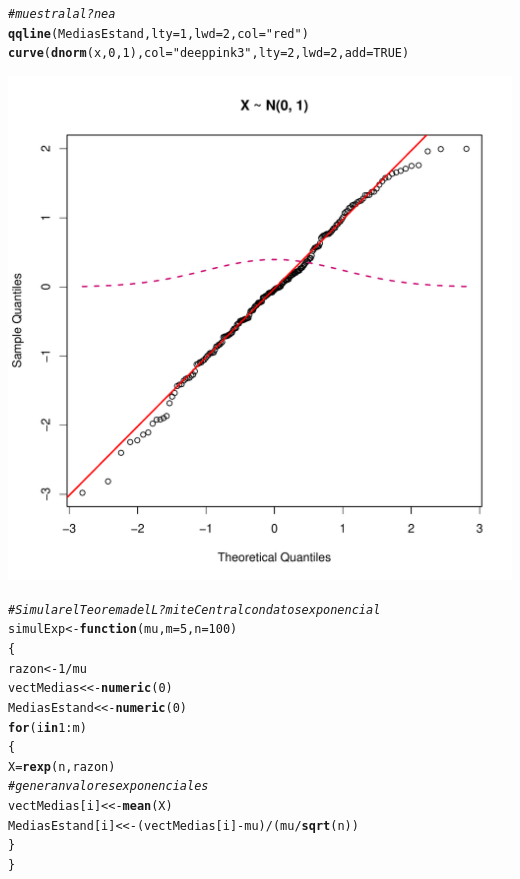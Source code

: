 \documentclass[10pt,a4paper]{article}\usepackage[]{graphicx}\usepackage[]{color}
\makeatletter
\def\maxwidth{ %
  \ifdim\Gin@nat@width>\linewidth
    \linewidth
  \else
    \Gin@nat@width
  \fi
}
\newcommand{\hlnum}[1]{\textcolor[rgb]{0.686,0.059,0.569}{#1}}%
\newcommand{\hlstr}[1]{\textcolor[rgb]{0.192,0.494,0.8}{#1}}%
\newcommand{\hlcom}[1]{\textcolor[rgb]{0.678,0.584,0.686}{\textit{#1}}}%
\newcommand{\hlopt}[1]{\textcolor[rgb]{0,0,0}{#1}}%
\newcommand{\hlstd}[1]{\textcolor[rgb]{0.345,0.345,0.345}{#1}}%
\newcommand{\hlkwa}[1]{\textcolor[rgb]{0.161,0.373,0.58}{\textbf{#1}}}%
\newcommand{\hlkwb}[1]{\textcolor[rgb]{0.69,0.353,0.396}{#1}}%
\newcommand{\hlkwc}[1]{\textcolor[rgb]{0.333,0.667,0.333}{#1}}%
\newcommand{\hlkwd}[1]{\textcolor[rgb]{0.737,0.353,0.396}{\textbf{#1}}}%
\newenvironment{kframe}{%
 \def\at@end@of@kframe{}%
 \ifinner\ifhmode%
  \def\at@end@of@kframe{\end{minipage}}%
  \begin{minipage}{\columnwidth}%
 \fi\fi%
 \def\FrameCommand##1{\hskip\@totalleftmargin \hskip-\fboxsep
 \colorbox{shadecolor}{##1}\hskip-\fboxsep
     \hskip-\linewidth \hskip-\@totalleftmargin \hskip\columnwidth}%
 \MakeFramed {\advance\hsize-\width
   \@totalleftmargin\z@ \linewidth\hsize
   \@setminipage}}%
 {\par\unskip\endMakeFramed%
 \at@end@of@kframe}
\newenvironment{knitrout}{}{} %
\makeatother
\begin{document}
\begin{knitrout}
\begin{kframe}
\begin{alltt}
\hlcom{#muestra la l?nea }
\hlkwd{qqline}\hlstd{(MediasEstand,} \hlkwc{lty}\hlstd{=}\hlnum{1}\hlstd{,} \hlkwc{lwd}\hlstd{=}\hlnum{2}\hlstd{,} \hlkwc{col}\hlstd{=}\hlstr{"red"}\hlstd{)}
\hlkwd{curve}\hlstd{(}\hlkwd{dnorm}\hlstd{(x,} \hlnum{0}\hlstd{,} \hlnum{1}\hlstd{),} \hlkwc{col} \hlstd{=} \hlstr{"deeppink3"}\hlstd{,} \hlkwc{lty}\hlstd{=}\hlnum{2}\hlstd{,} \hlkwc{lwd}\hlstd{=}\hlnum{2}\hlstd{,} \hlkwc{add}\hlstd{=}\hlnum{TRUE}\hlstd{)}
\end{alltt}
\end{kframe}
\includegraphics[width=\maxwidth]{figure/unnamed-chunk-2-2} 
\begin{kframe}\begin{alltt}
\hlcom{#Simular el Teorema del L?mite Central con datos exponencial}
\hlstd{simulExp} \hlkwb{<-} \hlkwa{function}\hlstd{(}\hlkwc{mu}\hlstd{,} \hlkwc{m}\hlstd{=}\hlnum{5}\hlstd{,} \hlkwc{n}\hlstd{=}\hlnum{100}\hlstd{)}
\hlstd{\{}
  \hlstd{razon} \hlkwb{<-} \hlnum{1}\hlopt{/}\hlstd{mu}
  \hlstd{vectMedias} \hlkwb{<<-} \hlkwd{numeric}\hlstd{(}\hlnum{0}\hlstd{)}
  \hlstd{MediasEstand} \hlkwb{<<-} \hlkwd{numeric}\hlstd{(}\hlnum{0}\hlstd{)}
  \hlkwa{for} \hlstd{(i} \hlkwa{in} \hlnum{1}\hlopt{:}\hlstd{m)}
  \hlstd{\{}
    \hlstd{X} \hlkwb{=} \hlkwd{rexp}\hlstd{(n, razon)}
    \hlcom{# genera n valores exponenciales }
    \hlstd{vectMedias[i]} \hlkwb{<<-} \hlkwd{mean}\hlstd{(X)}
    \hlstd{MediasEstand[i]} \hlkwb{<<-} \hlstd{(vectMedias[i]} \hlopt{-} \hlstd{mu)}\hlopt{/}\hlstd{(mu}\hlopt{/}\hlkwd{sqrt}\hlstd{(n))}
  \hlstd{\}}
\hlstd{\}}


\end{alltt}
\end{kframe}
\end{knitrout}
\end{document}
